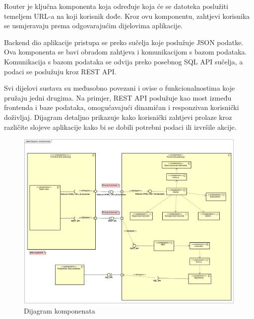 			 Router je ključna komponenta koja određuje koja će se datoteka poslužiti temeljem URL-a na koji korisnik dođe. Kroz ovu komponentu, zahtjevi korisnika se usmjeravaju prema odgovarajućim dijelovima aplikacije.
			 
			 Backend dio aplikacije pristupa se preko sučelja koje poslužuje JSON podatke. Ova komponenta se bavi obradom zahtjeva i komunikacijom s bazom podataka. Komunikacija s bazom podataka se odvija preko posebnog SQL API sučelja, a podaci se poslužuju kroz REST API.
			 
			 Svi dijelovi sustava su međusobno povezani i ovise o funkcionalnostima koje pružaju jedni drugima. Na primjer, REST API poslužuje kao most između frontenda i baze podataka, omogućavajući dinamičan i responzivan korisnički doživljaj. Dijagram detaljno prikazuje kako korisnički zahtjevi prolaze kroz različite slojeve aplikacije kako bi se dobili potrebni podaci ili izvršile akcije.
			 
			 \begin{figure}[H]
			 	\includegraphics[scale=0.45]{dijagrami/dijagram_komponenata.png}%
			 	\centering
			 	\caption{Dijagram komponenata}
			 	\label{fig:promjene}
			 \end{figure}
		